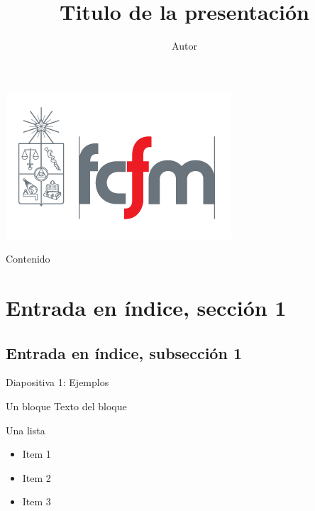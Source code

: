 \documentclass[10pt]{beamer}
\title{Titulo de la presentación}
\author[Autor]{Autor}
\institute[Universidad de Chile]{Universidad de Chile}
\date[\today]{}
\begin{document}

\begin{frame}
	\titlepage %
	
	\begin{center}
		\includegraphics[scale=0.2]{img/fcfm.png}
	\end{center}
\end{frame}


\begin{frame}{Contenido}
\tableofcontents
\end{frame}


\section{Entrada en índice, sección 1 }
\subsection{Entrada en índice, subsección 1}

\begin{frame}{Diapositiva 1: Ejemplos}
	
	\begin{block}{Un bloque}
		Texto del bloque
	\end{block}
	
	\vspace{1cm} %
	Una lista
	\begin{itemize}
		\item Item 1
		\item Item 2
		\item Item 3
	\end{itemize}

\end{frame}
\end{document}
